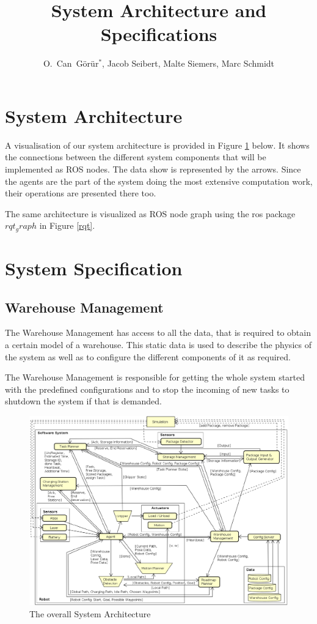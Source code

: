 \documentclass{article}
\title{\LARGE \bf System Architecture and Specifications}
\author{O.~Can~G\"{o}r\"{u}r$^{*}$, Jacob Seibert, Malte Siemers, Marc Schmidt}
\date{}
\begin{document}
\maketitle

\section{System Architecture}

A visualisation of our system architecture is provided in Figure \ref{arch} below. It shows the connections between the different system components that will be implemented as ROS nodes. The data show is represented by the arrows. Since the agents are the part of the system doing the most extensive computation work, their
operations are presented there too.

The same architecture is visualized as ROS node graph using the ros package $rqt_graph$ in Figure \ref{rqt}.

\section{System Specification}
\subsection{Warehouse Management}
The Warehouse Management has access to all the data, that is required to obtain a certain model of a warehouse. This static data is used to describe the physics of the system as well as to configure the different components of it as required.

The Warehouse Management is responsible for getting the whole
system started with the predefined configurations and to stop the incoming of new tasks to shutdown the system if that is demanded.

\begin{figure}[t!]
	\centering
	\includegraphics[scale=0.3,natwidth=1189,natheight=915]{architecture}
	\caption{The overall System Architecture}
	\label{arch}
\end{figure}
\end{document}
